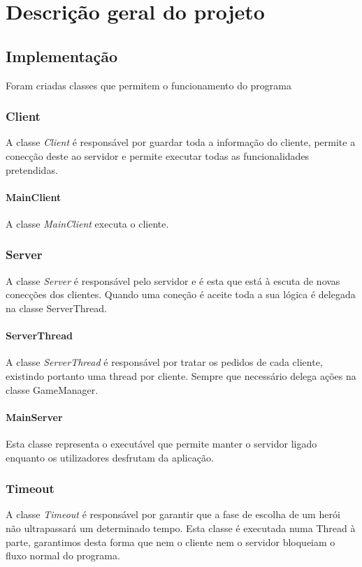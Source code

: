 \chapter{Descrição geral do projeto}
\section{Implementação}
Foram criadas classes que permitem o funcionamento do programa 
\subsection{Client}
A classe \textit{Client}  é responsável por guardar toda a informação do cliente, permite a conecção deste ao servidor e permite executar todas as funcionalidades pretendidas.  

\subsubsection{MainClient}
A classe \textit{MainClient}  executa o cliente.

\subsection{Server}
A classe \textit{Server} é responsável pelo servidor e é esta que está à escuta de novas conecções dos clientes. Quando uma coneção é aceite toda a sua lógica é delegada na classe ServerThread. 

\subsubsection{ServerThread}
A classe \textit{ServerThread} é responsável por tratar os pedidos de cada cliente, existindo portanto uma thread por cliente. Sempre que necessário delega ações na classe GameManager. 

\subsubsection{MainServer}
Esta classe representa o executável que permite manter o servidor ligado enquanto os
utilizadores desfrutam da aplicação.

\subsection{Timeout}
A classe \textit{Timeout} é responsável por garantir que a fase de escolha de um herói não ultrapassará um determinado tempo. Esta classe é executada numa Thread à parte, garantimos desta forma que nem o cliente nem o servidor bloqueiam o fluxo normal do programa. 

